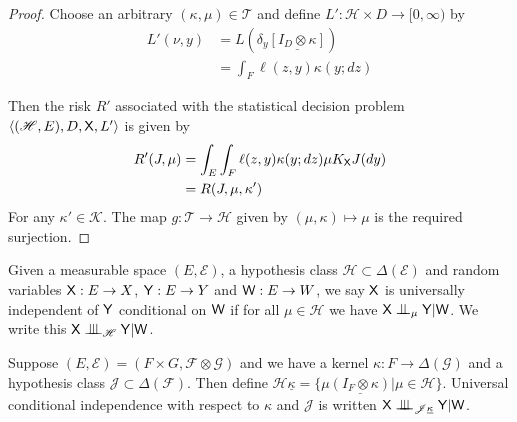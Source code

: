 \begin{proof}


Choose an arbitrary $(\kappa,\mu)\in\mathscr{T}$ and define $L':\mathscr{H}\times D\to [0,\infty)$ by
\begin{align}
    L'(\nu,y) &= L(\delta_y\underline{[I_D\otimes \kappa]})\\
              &= \int_F \ell(z,y) \kappa(y;dz)
\end{align}

Then the risk $R'$ associated with the statistical decision problem $\langle (\mathscr{H},E),D,\mathsf{X},L'\rangle$ is given by 
\begin{align}
    R'(J,\mu) &= \int_E \int_F \ell(z,y)  \kappa (y;dz) \mu K_{\mathsf{X}} J(dy)\\
              &= R(J,\mu,\kappa')
\end{align}
For any $\kappa'\in\mathscr{K}$. The map $g:\mathscr{T}\to\mathscr{H}$ given by $(\mu,\kappa)\mapsto \mu$ is the required surjection.
\end{proof}


\begin{definition}\label{def:univ_indep}
Given a measurable space $(E,\mathcal{E})$, a hypothesis class $\mathscr{H}\subset\Delta(\mathcal{E})$ and random variables $\mathsf{X}:E\to X$, $\mathsf{Y}:E\to Y$ and $\mathsf{W}:E\to W$, we say $\mathsf{X}$ is universally independent of $\mathsf{Y}$ conditional on $\mathsf{W}$ if for all $\mu\in\mathscr{H}$ we have $\RV{X}\CI_\mu \RV{Y} | \RV{W}$. We write this $\RV{X} \CII_\mathscr{H} \RV{Y} | \RV{W}$.
\end{definition}

Suppose $(E,\mathcal{E}) = (F\times G, \mathcal{F}\otimes \mathcal{G})$ and we have a kernel $\kappa:F\to \Delta(\mathcal{G})$ and a hypothesis class $\mathscr{J}\subset\Delta(\mathcal{F})$. Then define $\mathscr{H}\underline{\kappa}=\{\mu\underline{(I_F\otimes \kappa)}|\mu\in \mathscr{H}\}$. Universal conditional independence with respect to $\kappa$ and $\mathscr{J}$ is written $\RV{X}\CII_{\mathscr{J}\underline{\kappa}} \RV{Y} | \RV{W}$.